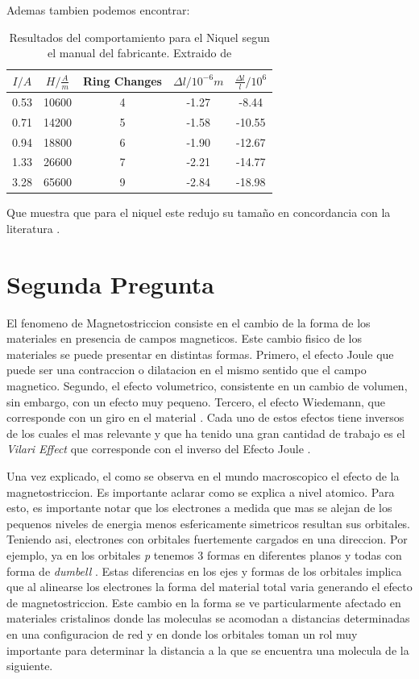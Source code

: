 \documentclass[a4paper, amsfonts, amssymb, amsmath, reprint, showkeys, nofootinbib, twoside]{revtex4-1}
\begin{document}
Ademas tambien podemos encontrar:

\begin{table}[H]
  \caption{\label{tab:iron} Resultados del comportamiento para el Niquel segun el manual del fabricante. Extraido de \cite{Guia}}
  \begin{ruledtabular}
    \begin{tabular}{ccccc}
      $I/A$ & $H/\frac{A}{m}$ & Ring Changes & $\Delta l / 10^{-6}m$ & $\frac{\Delta l}{l}/10^6$\\
      \hline
      0.53 & 10600 & 4 & -1.27 & -8.44 \\
      0.71 & 14200 & 5 & -1.58 & -10.55 \\
      0.94 & 18800 & 6 & -1.90 & -12.67 \\
      1.33 & 26600 & 7 & -2.21 & -14.77 \\
      3.28 & 65600 & 9 & -2.84 & -18.98 \\
    \end{tabular}
  \end{ruledtabular}
\end{table}

Que muestra que para el niquel este redujo su tamaño en concordancia con la literatura \cite{Guia}.


\section{Segunda Pregunta}

El fenomeno de Magnetostriccion consiste en el cambio de la forma de los materiales en presencia de campos magneticos\cite{Piercy_1997}. Este cambio fisico de los materiales se puede presentar en distintas formas. Primero, el efecto Joule que puede ser una contraccion o dilatacion en el mismo sentido que el campo magnetico. Segundo, el efecto volumetrico, consistente en un cambio de volumen, sin embargo, con un efecto muy pequeno. Tercero, el efecto Wiedemann, que corresponde con un giro en el material \cite{Ekreem_2007}. Cada uno de estos efectos tiene inversos de los cuales el mas relevante y que ha tenido una gran cantidad de trabajo es el \textit{Vilari Effect} que corresponde con el inverso del Efecto Joule \cite{Lee_2002}.

Una vez explicado, el como se observa en el mundo macroscopico el efecto de la magnetostriccion. Es importante aclarar como se explica a nivel atomico. Para esto, es importante notar que los electrones a medida que mas se alejan de los pequenos niveles de energia menos esfericamente simetricos resultan sus orbitales. Teniendo asi, electrones con orbitales fuertemente cargados en una direccion. Por ejemplo, ya en los orbitales \textit{p} tenemos 3 formas en diferentes planos y todas con forma de \textit{dumbell} \cite{callister_2000}. Estas diferencias en los ejes y formas de los orbitales implica que al alinearse los electrones la forma del material total varia generando el efecto de magnetostriccion. Este cambio en la forma se ve particularmente afectado en materiales cristalinos donde las moleculas se acomodan a distancias determinadas en una configuracion de red y en donde los orbitales toman un rol muy importante para determinar la distancia a la que se encuentra una molecula de la siguiente\cite{Ekreem_2007}.
\end{document}
